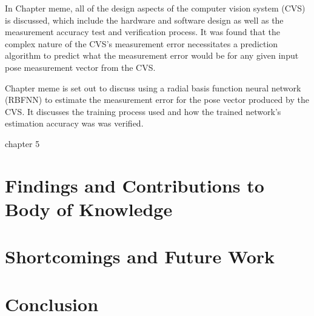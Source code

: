 In Chapter meme, all of the design aspects of the computer vision system (CVS) is discussed, which include the hardware and software design as well as the measurement accuracy test and verification process. It was found that the complex nature of the CVS's measurement error necessitates a prediction algorithm to predict what the measurement error would be for any given input pose measurement vector from the CVS. 

Chapter meme is set out to discuss using a radial basis function neural network (RBFNN) to estimate the measurement error for the pose vector produced by the CVS. It discusses the training process used and how the trained network's estimation accuracy was was verified. 

chapter 5


\section{Findings and Contributions to Body of Knowledge}

\section{Shortcomings and Future Work}

\section{Conclusion}
